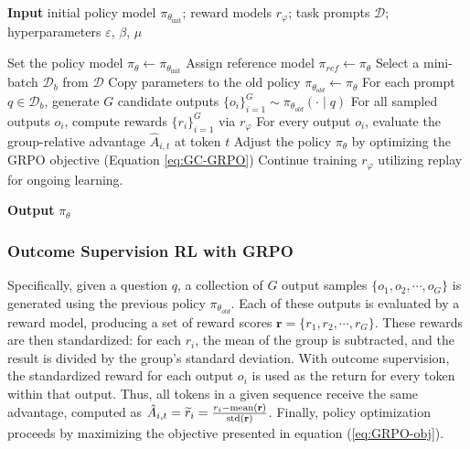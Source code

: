 \begin{itemize}[topsep=0pt]
\begin{itemize}[topsep=0pt]
\begin{algorithm}[t]
  \small
  \caption{Iterative Group Relative Policy Optimization}
  \textbf{Input} initial policy model $\pi_{\theta_{\text{init}}}$; reward models $r_\varphi$; task prompts $\mathcal{D}$; 
  hyperparameters $\varepsilon$, $\beta$, $\mu$
  \begin{algorithmic}[1]
    \State Set the policy model $\pi_\theta \gets \pi_{\theta_{\text{init}}}$
       \State Assign reference model $\pi_{ref} \gets \pi_{\theta}$
      \State Select a mini-batch $\mathcal{D}_b$ from $\mathcal{D}$
      \State Copy parameters to the old policy $\pi_{\theta_{old}} \gets \pi_{\theta}$
      \State For each prompt $q \in \mathcal{D}_b$, generate $G$ candidate outputs $\{o_i\}_{i=1}^G \sim \pi_{\theta_{old}} (\cdot \mid q)$
      \State For all sampled outputs $o_i$, compute rewards $\{r_i\}_{i=1}^{G}$ via $r_\varphi$
      \State For every output $o_i$, evaluate the group-relative advantage $\hat{A}_{i,t}$ at token $t$
        \State Adjust the policy $\pi_\theta$ by optimizing the GRPO objective (Equation \ref{eq:GC-GRPO})
      \EndFor
    \EndFor
    \State Continue training $r_\varphi$ utilizing replay for ongoing learning.
    \EndFor 
  \end{algorithmic}
  \textbf{Output} $\pi_\theta$
  \label{alg:iter-grpo}
\end{algorithm}

\subsubsection{Outcome Supervision RL with GRPO} Specifically, given a question $q$, a collection of $G$ output samples $\{o_1, o_2, \cdots, o_G\}$ is generated using the previous policy $\pi_{\theta_{old}}$. Each of these outputs is evaluated by a reward model, producing a set of reward scores $\mathbf{r} = \{r_1, r_2, \cdots, r_G\}$. These rewards are then standardized: for each $r_i$, the mean of the group is subtracted, and the result is divided by the group's standard deviation. With outcome supervision, the standardized reward for each output $o_i$ is used as the return for every token within that output. Thus, all tokens in a given sequence receive the same advantage, computed as $\hat{A}_{i, t} = \widetilde{r}_i = \frac{r_i- {\rm mean}(\mathbf{r})}{{\rm std}(\mathbf{r})}$. Finally, policy optimization proceeds by maximizing the objective presented in equation (\ref{eq:GRPO-obj}).


\end{itemize}
\end{itemize}
